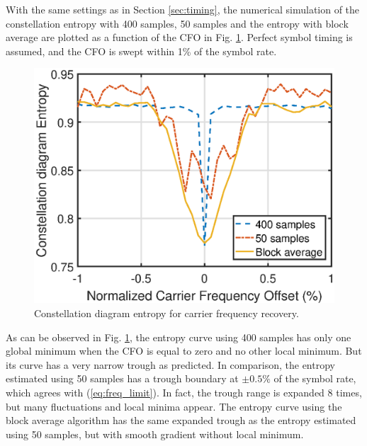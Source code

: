 \documentclass[journal,comsoc, onecolumn, 12pt,draftclsnofoot]{IEEEtran} %
\begin{document}
With the same settings as in Section \ref{sec:timing}, the numerical simulation of the constellation entropy with 400 samples, 50 samples and the entropy with block average are plotted as a function of the CFO in Fig. \ref{fig:freq_entp}.
Perfect symbol timing is assumed, and the CFO is swept within 1\% of the symbol rate.



\begin{figure}[ht]
\centering
\includegraphics[width=3 in]{pic/freq.eps}
\caption{Constellation diagram entropy for carrier frequency recovery.}
\label{fig:freq_entp} 
\end{figure}   

As can be observed in Fig. \ref{fig:freq_entp}, the entropy curve using 400 samples has only one global minimum when the CFO is equal to zero and no other local minimum.
But its curve has a very narrow trough as predicted.
In comparison, the entropy estimated using 50 samples has a trough boundary at \(\pm 0.5\%\) of the symbol rate, which agrees with (\ref{eq:freq_limit}).
In fact, the trough range is expanded 8 times, but many fluctuations and local minima appear.
The entropy curve using the block average algorithm has the same expanded trough as the entropy estimated using 50 samples, but with smooth gradient without local minimum.
\end{document}
